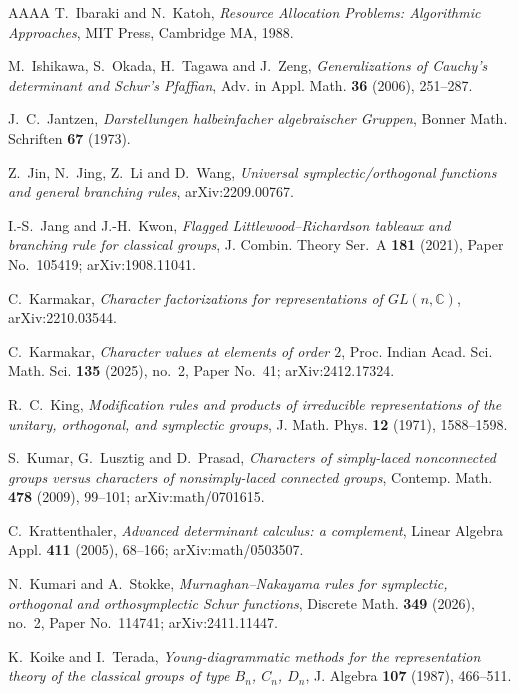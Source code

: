\documentclass[11pt,reqno]{amsart}
\theoremstyle{plain}
\theoremstyle{definition}
\newcommand{\CC}{\mathbb{C}}
\begin{document}
\begin{thebibliography}{AAAA}
 T.~Ibaraki and N.~Katoh, \emph{Resource Allocation Problems: Algorithmic
Approaches}, MIT Press, Cambridge MA, 1988.

 M.~Ishikawa, S.~Okada, H.~Tagawa and J.~Zeng, \emph{Generalizations of
Cauchy's determinant and Schur's Pfaffian}, Adv. in Appl. Math. \textbf{36} (2006), 251--287.

 J.~C.~Jantzen, \emph{Darstellungen halbeinfacher algebraischer Gruppen},
Bonner Math. Schriften \textbf{67} (1973).

 Z.~Jin, N.~Jing, Z.~Li and D.~Wang, \emph{Universal symplectic/orthogonal
functions and general branching rules}, arXiv:2209.00767.

 I.-S.~Jang and J.-H.~Kwon, \emph{Flagged Littlewood--Richardson tableaux
and branching rule for classical groups}, J. Combin. Theory Ser.~A \textbf{181} (2021),
Paper No.~105419; arXiv:1908.11041.

 C.~Karmakar, \emph{Character factorizations for representations of
$GL(n,\CC)$}, arXiv:2210.03544.

 C.~Karmakar, \emph{Character values at elements of order $2$},
Proc. Indian Acad. Sci. Math. Sci. \textbf{135} (2025), no.~2, Paper No.~41; arXiv:2412.17324.

 R.~C.~King, \emph{Modification rules and products of irreducible
representations of the unitary, orthogonal, and symplectic groups}, J. Math. Phys. \textbf{12}
(1971), 1588--1598.

 S.~Kumar, G.~Lusztig and D.~Prasad, \emph{Characters of simply-laced
nonconnected groups versus characters of nonsimply-laced connected groups}, Contemp. Math.
\textbf{478} (2009), 99--101; arXiv:math/0701615.

 C.~Krattenthaler, \emph{Advanced determinant calculus: a complement},
Linear Algebra Appl. \textbf{411} (2005), 68--166; arXiv:math/0503507.

 N.~Kumari and A.~Stokke, \emph{Murnaghan--Nakayama rules for symplectic,
orthogonal and orthosymplectic Schur functions}, Discrete Math. \textbf{349} (2026), no.~2, Paper
No.~114741; arXiv:2411.11447.

 K.~Koike and I.~Terada, \emph{Young-diagrammatic methods for the representation
theory of the classical groups of type $B_n$, $C_n$, $D_n$}, J. Algebra \textbf{107} (1987),
466--511.


\end{thebibliography}
\end{document}

